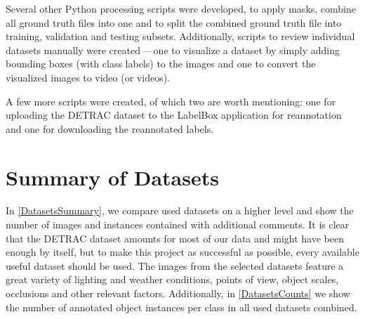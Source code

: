 Several other Python processing scripts were developed, to apply masks, combine
all ground truth files into one and to split the combined ground truth file into
training, validation and testing subsets. Additionally, scripts to review
individual datasets manually were created\,---\,one to visualize a dataset by simply
adding bounding boxes (with class labels) to the images and one to convert the
visualized images to video (or videos).

A few more scripts were created, of which two are worth mentioning: one for
uploading the DETRAC dataset to the LabelBox application for reannotation and
one for downloading the reannotated labels.


\section{Summary of Datasets}

In \autoref{DatasetsSummary}, we compare used datasets on a higher level and
show the number of images and instances contained with additional comments. It
is clear that the DETRAC dataset amounts for most of our
data and might have been enough by itself, but to make this project as
successful as possible, every available useful dataset should be used. The
images from the selected datasets feature a great variety of lighting and
weather conditions, points of view, object scales, occlusions and other relevant factors.
Additionally, in \autoref{DatasetsCounts} we show the number of annotated object
instances per class in all used datasets combined.


